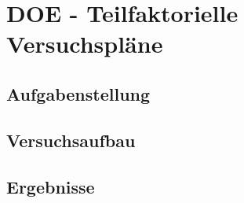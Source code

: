 \chapter{DOE - Teilfaktorielle Versuchspläne}
\label{sec: Hauptkapitel 1}

\section{Aufgabenstellung}

\section{Versuchsaufbau}

\section{Ergebnisse}
